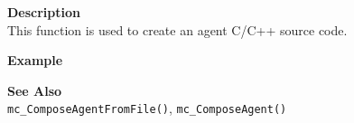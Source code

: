 \noindent
{\bf Description}\\
This function is used to create an agent C/C++ source code. 

\noindent
{\bf Example}\\
\noindent
{\footnotesize}

\noindent
{\bf See Also}\\
\texttt{mc\_ComposeAgentFromFile()}, \texttt{mc\_ComposeAgent()}

